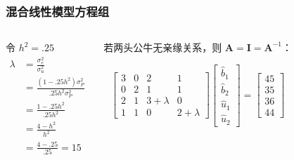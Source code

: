 \documentclass[serif,aspectratio=169]{beamer}
\begin{document}
\begin{frame}
\begin{columns}
\begin{frame}
\end{frame}

\begin{frame}
  \frametitle{混合线性模型方程组}
  \begin{columns}
    \begin{column}{.4\textwidth}
      令 $h^2=.25$
      \begin{align*}
        \lambda &= \frac{\sigma_e^2}{\sigma_u^2}\\
        &=\frac{(1-.25h^2)\sigma_P^2}{.25h^2\sigma_P^2}\\
        &=\frac{1-.25h^2}{.25h^2}\\
        &=\frac{4-h^2}{h^2}\\
        &=\frac{4-.25}{.25}=15
      \end{align*}
    \end{column}

    \begin{column}{.6\textwidth}
      若两头公牛无亲缘关系，则 $\mathbf{A=I=A}^{-1}$：
      
      $$
      \left[\begin{array}{cccc}
          3 & 0 & 2 & 1\\
          0 & 2 & 1 & 1\\
          2 & 1 & 3+\lambda & 0\\
          1 & 1 & 0 & 2+\lambda
        \end{array}\right]
      \left[\begin{array}{c}
          \hat{b}_1\\
          \hat{b}_2\\
          \hat{u}_1\\
          \hat{u}_2
        \end{array}\right]=
      \left[\begin{array}{c}
          45\\
          35\\
          36\\
          44
        \end{array}\right]
      $$
      
    \end{column}
  \end{columns}
\end{frame}



\end{columns}
\end{frame}
\end{document}
